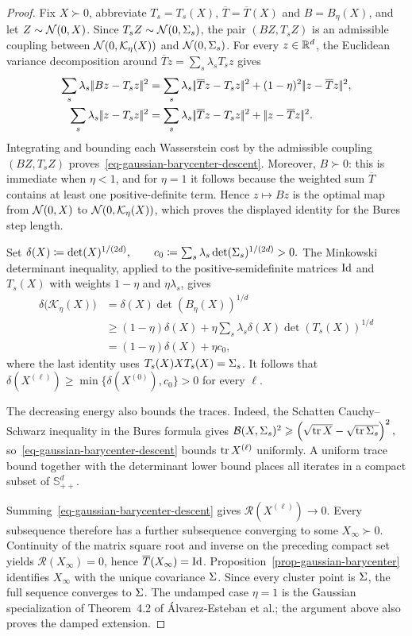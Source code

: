 \begin{proof}
Fix $X\succ0$, abbreviate $T_s=T_s(X)$, $\overline T=\overline T(X)$ and $B=B_\eta(X)$, and let $Z\sim\mathcal{N}(0,X)$. Since $T_sZ\sim\mathcal{N}(0,\Sigma_s)$, the pair $(BZ,T_sZ)$ is an admissible coupling between $\mathcal{N}(0,\mathcal K_\eta(X))$ and $\mathcal{N}(0,\Sigma_s)$. For every $z\in\mathbb{R}^d$, the Euclidean variance decomposition around $\overline Tz=\sum_s\lambda_sT_sz$ gives
\begin{align*}
\sum_s\lambda_s\norm{Bz-T_sz}^2
&=
\sum_s\lambda_s\norm{\overline Tz-T_sz}^2
+(1-\eta)^2\norm{z-\overline Tz}^2,
\\
\sum_s\lambda_s\norm{z-T_sz}^2
&=
\sum_s\lambda_s\norm{\overline Tz-T_sz}^2
+\norm{z-\overline Tz}^2.
\end{align*}
Integrating and bounding each Wasserstein cost by the admissible coupling $(BZ,T_sZ)$ proves~\eqref{eq-gaussian-barycenter-descent}. Moreover, $B\succ0$: this is immediate when $\eta<1$, and for $\eta=1$ it follows because the weighted sum $\overline T$ contains at least one positive-definite term. Hence $z\mapsto Bz$ is the optimal map from $\mathcal{N}(0,X)$ to $\mathcal{N}(0,\mathcal K_\eta(X))$, which proves the displayed identity for the Bures step length.

Set
\(\delta(X)\coloneqq\det(X)^{1/(2d)}, \qquad c_0\coloneqq\sum_s\lambda_s\det(\Sigma_s)^{1/(2d)}>0.\)
The Minkowski determinant inequality, applied to the positive-semidefinite matrices $\mathrm{Id}$ and $T_s(X)$ with weights $1-\eta$ and $\eta\lambda_s$, gives
\begin{align*}
\delta\bigl(\mathcal K_\eta(X)\bigr)
&=
\delta(X)\det(B_\eta(X))^{1/d}
\\
&\geq
(1-\eta)\delta(X)
+
\eta\sum_s\lambda_s
\delta(X)\det(T_s(X))^{1/d}
\\
&=
(1-\eta)\delta(X)+\eta c_0,
\end{align*}
where the last identity uses $T_s(X)XT_s(X)=\Sigma_s$. It follows that
$\delta(X^{(\ell)})\geq\min\{\delta(X^{(0)}),c_0\}>0$ for every $\ell$.

The decreasing energy also bounds the traces. Indeed, the Schatten Cauchy--Schwarz inequality in the Bures formula gives \(\mathcal{B}(X,\Sigma_s)^2 \geqslant \left( \sqrt{\operatorname{tr} X}-\sqrt{\operatorname{tr}\Sigma_s} \right)^2,\)
so~\eqref{eq-gaussian-barycenter-descent} bounds $\operatorname{tr} X^{(\ell)}$ uniformly. A uniform trace bound together with the determinant lower bound places all iterates in a compact subset of $\mathbb S_{++}^d$.

Summing~\eqref{eq-gaussian-barycenter-descent} gives $\mathcal R(X^{(\ell)})\to0$. Every subsequence therefore has a further subsequence converging to some $X_\infty\succ0$. Continuity of the matrix square root and inverse on the preceding compact set yields $\mathcal R(X_\infty)=0$, hence $\overline T(X_\infty)=\mathrm{Id}$. Proposition~\ref{prop-gaussian-barycenter} identifies $X_\infty$ with the unique covariance $\Sigma$. Since every cluster point is $\Sigma$, the full sequence converges to $\Sigma$. The undamped case $\eta=1$ is the Gaussian specialization of Theorem~4.2 of \'Alvarez-Esteban et al.; the argument above also proves the damped extension.
\end{proof}
